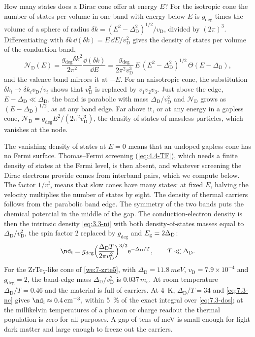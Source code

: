 How many states does a Dirac cone offer at energy $E$? For the isotropic cone the number of states per volume in one band with energy below $E$ is $g_{\mathrm{deg}}$ times the volume of a sphere of radius $\delta k = (E^2 - \Delta_{\mathrm{D}}^2)^{1/2}/v_{\mathrm{D}}$, divided by $(2\pi)^3$. Differentiating with $\delta k\,\dd(\delta k) = E\,\dd E/v_{\mathrm{D}}^2$ gives the density of states per volume of the conduction band,
\begin{equation}
  \mathcal{N}_{\mathrm{D}}(E) = \frac{g_{\mathrm{deg}}\delta k^2}{2\pi^2}\frac{\dd(\delta k)}{\dd E} = \frac{g_{\mathrm{deg}}}{2\pi^2v_{\mathrm{D}}^3}\,E\,(E^2 - \Delta_{\mathrm{D}}^2)^{1/2}\,\Theta(E - \Delta_{\mathrm{D}}) ,
  \label{eq:7.3-dos}
\end{equation}
and the valence band mirrors it at $-E$. For an anisotropic cone, the substitution $\delta k_i \to \delta k_i v_{\mathrm{D}}/v_i$ shows that $v_{\mathrm{D}}^3$ is replaced by $v_1v_2v_3$. Just above the edge, $E - \Delta_{\mathrm{D}} \ll \Delta_{\mathrm{D}}$, the band is parabolic with mass $\Delta_{\mathrm{D}}/v_{\mathrm{D}}^2$ and $\mathcal{N}_{\mathrm{D}}$ grows as $(E - \Delta_{\mathrm{D}})^{1/2}$, as at any band edge. Far above it, or at any energy in a gapless cone, $\mathcal{N}_{\mathrm{D}} = g_{\mathrm{deg}}E^2/(2\pi^2v_{\mathrm{D}}^3)$, the density of states of massless particles, which vanishes at the node.

The vanishing density of states at $E = 0$ means that an undoped gapless cone has no Fermi surface. Thomas--Fermi screening (\cref{eq:4.4-TF}), which needs a finite density of states at the Fermi level, is then absent, and whatever screening the Dirac electrons provide comes from interband pairs, which we compute below. The factor $1/v_{\mathrm{D}}^3$ means that slow cones have many states: at fixed $E$, halving the velocity multiplies the number of states by eight. The density of thermal carriers follows from the parabolic band edge. The symmetry of the two bands puts the chemical potential in the middle of the gap. The conduction-electron density is then the intrinsic density \cref{eq:3.3-ni} with both density-of-states masses equal to $\Delta_{\mathrm{D}}/v_{\mathrm{D}}^2$, the spin factor 2 replaced by $g_{\mathrm{deg}}$ and $E_{\mathrm{g}} = 2\Delta_{\mathrm{D}}$:
\begin{equation}
  \nd_{\mathrm{i}} = g_{\mathrm{deg}}\Bigl(\frac{\Delta_{\mathrm{D}}T}{2\pi v_{\mathrm{D}}^2}\Bigr)^{3/2}\ee^{-\Delta_{\mathrm{D}}/T} , \qquad T \ll \Delta_{\mathrm{D}} .
  \label{eq:7.3-nc}
\end{equation}
For the ZrTe$_5$-like cone of \cref{we:7-zrte5}, with $\Delta_{\mathrm{D}} = \SI{11.8}{meV}$, $v_{\mathrm{D}} = 7.9\times10^{-4}$ and $g_{\mathrm{deg}} = 2$, the band-edge mass $\Delta_{\mathrm{D}}/v_{\mathrm{D}}^2$ is $0.037\,m_e$. At room temperature $\Delta_{\mathrm{D}}/T = 0.46$ and the material is full of carriers. At \SI{4}{K}, $\Delta_{\mathrm{D}}/T = 34$ and \cref{eq:7.3-nc} gives $\nd_{\mathrm{i}} \approx \SI{0.4}{cm^{-3}}$, within \SI{5}{\percent} of the exact integral over \cref{eq:7.3-dos}; at the millikelvin temperatures of a phonon or charge readout the thermal population is zero for all purposes. A gap of tens of meV is small enough for light dark matter and large enough to freeze out the carriers.

